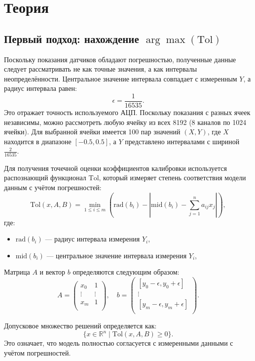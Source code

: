 \documentclass[a4paper,14pt]{extarticle}
\begin{document}
\section{Теория}

\subsection{Первый подход: нахождение $\arg\max(\text{Tol})$}

Поскольку показания датчиков обладают погрешностью, полученные данные следует рассматривать не как точные значения, а как интервалы неопределённости. Центральное значение интервала совпадает с измеренным $ Y $, а радиус интервала равен:
$$
\epsilon = \frac{1}{16535}.
$$
Это отражает точность используемого АЦП. Поскольку показания с разных ячеек независимы, можно рассмотреть любую ячейку из всех 8192 (8 каналов по 1024 ячейки). Для выбранной ячейки имеется 100 пар значений $ (X, Y) $, где $ X $ находится в диапазоне $[-0.5, 0.5]$, а $ Y $ представлено интервалами с шириной $ \frac{2}{16535} $.

Для получения точечной оценки коэффициентов калибровки используется распознающий функционал $\text{Tol}$, который измеряет степень соответствия модели данным с учётом погрешностей:
$$
\text{Tol}(x, A, B) = \min_{1 \leq i \leq m} \left( \text{rad}(b_i) - \left| \text{mid}(b_i) - \sum_{j=1}^{n} a_{ij}x_j \right| \right),
$$
где:
\begin{itemize}
    \item $\text{rad}(b_i)$ — радиус интервала измерения $ Y_i $,
    \item $\text{mid}(b_i)$ — центральное значение интервала измерения $ Y_i $,
\end{itemize}

Матрица $ A $ и вектор $ b $ определяются следующим образом:
$$
A =
\begin{pmatrix}
x_0 & 1 \\
\vdots & \vdots \\
x_m & 1 \\
\end{pmatrix},
\quad
b =
\begin{pmatrix}
[y_0 - \epsilon, y_0 + \epsilon] \\
\vdots \\
[y_m - \epsilon, y_m + \epsilon] \\
\end{pmatrix}.
$$

Допусковое множество решений определяется как:
$$
\{ x \in \mathbb{R}^n \mid \text{Tol}(x, A, B) \geq 0 \}.
$$
Это означает, что модель полностью согласуется с измеренными данными с учётом погрешностей.
\end{document}
